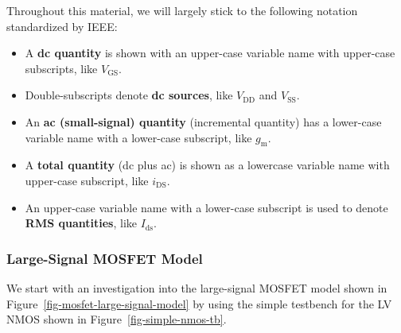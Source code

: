 \documentclass[
  a4paper,
  DIV=11,
  numbers=noendperiod]{scrartcl}
\providecommand{\tightlist}{%
  \setlength{\itemsep}{0pt}\setlength{\parskip}{0pt}}\usepackage{longtable,booktabs,array}
\begin{document}
\begin{tcolorbox}[enhanced jigsaw, titlerule=0mm, left=2mm, coltitle=black, toprule=.15mm, breakable, opacitybacktitle=0.6, colframe=quarto-callout-important-color-frame, bottomtitle=1mm, toptitle=1mm, opacityback=0, colbacktitle=quarto-callout-important-color!10!white, title=\textcolor{quarto-callout-important-color}{\faExclamation}\hspace{0.5em}{Mathematical Notation}, arc=.35mm, rightrule=.15mm, colback=white, bottomrule=.15mm, leftrule=.75mm]

Throughout this material, we will largely stick to the following
notation standardized by IEEE:

\begin{itemize}
\tightlist
\item
  A \textbf{dc quantity} is shown with an upper-case variable name with
  upper-case subscripts, like \(V_\mathrm{GS}\).
\item
  Double-subscripts denote \textbf{dc sources}, like \(V_\mathrm{DD}\)
  and \(V_\mathrm{SS}\).
\item
  An \textbf{ac (small-signal) quantity} (incremental quantity) has a
  lower-case variable name with a lower-case subscript, like
  \(g_\mathrm{m}\).
\item
  A \textbf{total quantity} (dc plus ac) is shown as a lowercase
  variable name with upper-case subscript, like \(i_\mathrm{DS}\).
\item
  An upper-case variable name with a lower-case subscript is used to
  denote \textbf{RMS quantities}, like \(I_\mathrm{ds}\).
\end{itemize}

\end{tcolorbox}

\subsubsection{Large-Signal MOSFET
Model}\label{large-signal-mosfet-model}

We start with an investigation into the large-signal MOSFET model shown
in Figure~\ref{fig-mosfet-large-signal-model} by using the simple
testbench for the LV NMOS shown in Figure~\ref{fig-simple-nmos-tb}.
\end{document}
